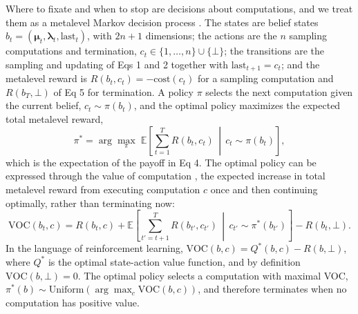 \documentclass[10pt,letterpaper]{article}
\begin{document}
Where to fixate and when to stop are decisions about computations, and
we treat them as a metalevel Markov decision process
\cite{hay2012,callaway2021,lieder2026}. The states are belief states
\(b_t = (\boldsymbol{\mu}_t, \boldsymbol{\lambda}_t, \text{last}_t)\),
with \(2n + 1\) dimensions; the actions are the \(n\) sampling
computations and termination, \(c_t \in \{1, \dots, n\} \cup \{\bot\}\);
the transitions are the sampling and updating of Eqs 1 and 2 together
with \(\text{last}_{t+1} = c_t\); and the metalevel reward is
\(R(b_t, c_t) = -\text{cost}(c_t)\) for a sampling computation and
\(R(b_T, \bot)\) of Eq 5 for termination. A policy \(\pi\) selects the
next computation given the current belief, \(c_t \sim \pi(b_t)\), and
the optimal policy maximizes the expected total metalevel reward,
\begin{equation}
\pi^* = \arg\max_{\pi}\; \mathbb{E}\!\left[\sum_{t=1}^{T} R(b_t, c_t) \,\middle|\, c_t \sim \pi(b_t)\right], 
\end{equation} which is the expectation of the payoff in Eq 4. The
optimal policy can be expressed through the value of computation
\cite{russell1991,hay2012}, the expected increase in total metalevel
reward from executing computation \(c\) once and then continuing
optimally, rather than terminating now: \begin{equation}
\text{VOC}(b_t, c) = R(b_t, c) + \mathbb{E}\!\left[\sum_{t' = t+1}^{T} R(b_{t'}, c_{t'}) \,\middle|\, c_{t'} \sim \pi^*(b_{t'})\right] - R(b_t, \bot). 
\end{equation} In the language of reinforcement learning,
\(\text{VOC}(b, c) = Q^*(b, c) - R(b, \bot)\), where \(Q^*\) is the
optimal state-action value function, and by definition
\(\text{VOC}(b, \bot) = 0\). The optimal policy selects a computation
with maximal VOC,
\(\pi^*(b) \sim \text{Uniform}(\arg\max_c \text{VOC}(b, c))\), and
therefore terminates when no computation has positive value.
\end{document}
